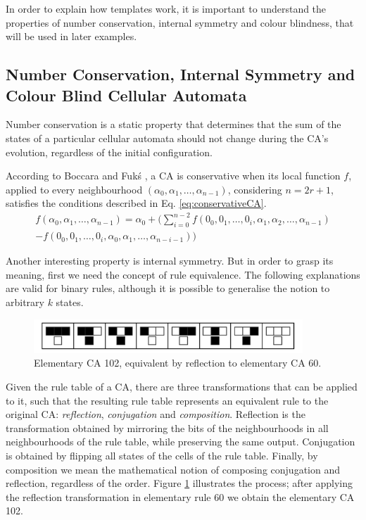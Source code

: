\documentclass{llncs}
\begin{document}
In order to explain how templates work, it is important to understand the properties of number conservation, internal symmetry and colour blindness, that will be used in later examples.

\subsection{Number Conservation, Internal Symmetry and Colour Blind Cellular Automata}
Number conservation is a static property that determines that the sum of the states of a particular cellular automata should not change during the CA's evolution, regardless of the initial configuration.

According to Boccara and Fukś \cite{boccara2002}, a CA is conservative when its local function $f$, applied to every neighbourhood $(\alpha_0,\alpha_1, \dots, \alpha_{n-1})$, considering $n=2r+1$, satisfies the conditions described in Eq. \ref{eq:conservativeCA}.
\begin{equation}
\begin{split}
f(\alpha_0,\alpha_1, \dots,\alpha_{n-1}) = \alpha_0 + (\sum_{i=0}^{n-2}f(0_0,0_1, \dots,0_i,\alpha_1,\alpha_2, \dots,\alpha_{n-1}) \\- f(0_0,0_1, \dots,0_i,\alpha_0,\alpha_1, \dots,\alpha_{n-i-1}))
\label{eq:conservativeCA}
\end{split}
\end{equation}

Another interesting property is internal symmetry. But in order to grasp its meaning, first we need the concept of rule equivalence. The following explanations are valid for binary rules, although it is possible to generalise the notion to arbitrary $k$ states.
  \begin{figure}
    \centering
    \includegraphics[width=0.9\textwidth]{Figure2.pdf}
    \caption{Elementary CA 102, equivalent by reflection to elementary CA 60.}
    \label{fig:table102}
  \end{figure}
  
Given the rule table of a CA, there are three transformations that can be applied to it, such that the resulting rule table represents an equivalent rule to the original CA: \textit{reflection}, \textit{conjugation} and \textit{composition}. Reflection is the transformation obtained by mirroring the bits of the neighbourhoods in all neighbourhoods of the rule table, while preserving the same output. Conjugation is obtained by flipping all states of the cells of the rule table. Finally, by composition we mean the mathematical notion of composing conjugation and reflection, regardless of the order. Figure \ref{fig:table102} illustrates the process; after applying the reflection transformation in elementary rule 60 we obtain the elementary CA 102.
\end{document}
